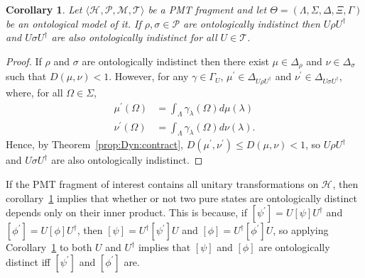 \documentclass[DIV=calc,paper=a4,fontsize=11pt,twocolumn]{scrartcl} %
\theoremstyle{definition}
\theoremstyle{plain}
\newtheorem{corollary}[definition]{Corollary}
\newcommand{\Proj}[1]{\ensuremath{\left [ #1 \right ]}}
\newcommand{\Hilb}[1][]{\ensuremath{\mathcal{H}_{#1}}}
\begin{document}
\begin{corollary}
\label{cor:Dyn:contract}
Let $\langle \Hilb, \mathcal{P}, \mathcal{M}, \mathcal{T} \rangle$
be a PMT fragment and let $\Theta = (\Lambda, \Sigma, \Delta, \Xi,
\Gamma)$ be an ontological model of it.  If $\rho, \sigma \in
\mathcal{P}$ are ontologically indistinct then $U\rho U^{\dagger}$
and $U \sigma U^{\dagger}$ are also ontologically indistinct for all
$U \in \mathcal{T}$.
\end{corollary}
\begin{proof}
If $\rho$ and $\sigma$ are ontologically indistinct then there exist
$\mu \in \Delta_{\rho}$ and $\nu \in \Delta_{\sigma}$ such that
$D(\mu,\nu) < 1$.  However, for any $\gamma \in \Gamma_U$,
$\mu^{\prime} \in \Delta_{U \rho U^{\dagger}}$ and $\nu^{\prime} \in
\Delta_{U \sigma U^{\dagger}}$, where, for all $\Omega \in \Sigma$,
\begin{align}
\mu^{\prime}(\Omega) & = \int_{\Lambda}
\gamma_{\lambda}(\Omega)d\mu(\lambda) \\
\nu^{\prime}(\Omega) & = \int_{\Lambda} \gamma_{\lambda}(\Omega)
d\nu(\lambda).
\end{align}
Hence, by Theorem~\ref{prop:Dyn:contract},
$D(\mu^{\prime},\nu^{\prime}) \leq D(\mu,\nu) < 1$, so $U \rho
U^{\dagger}$ and $U \sigma U^{\dagger}$ are also ontologically
indistinct.
\end{proof}

If the PMT fragment of interest contains all unitary transformations
on $\Hilb$, then corollary~\ref{cor:Dyn:contract} implies that whether
or not two pure states are ontologically distinct depends only on
their inner product.  This is because, if $\Proj{\psi^{\prime}} =
U\Proj{\psi}U^{\dagger}$ and $\Proj{\phi^{\prime}} = U
\Proj{\phi}U^{\dagger}$, then $\Proj{\psi} =
U^{\dagger}\Proj{\psi^{\prime}}U$ and $\Proj{\phi} = U^{\dagger}
\Proj{\phi^{\prime}} U$, so applying Corollary~\ref{cor:Dyn:contract}
to both $U$ and $U^{\dagger}$ implies that $\Proj{\psi}$ and
$\Proj{\phi}$ are ontologically distinct iff $\Proj{\psi^{\prime}}$
and $\Proj{\phi^{\prime}}$ are.
\end{document}
